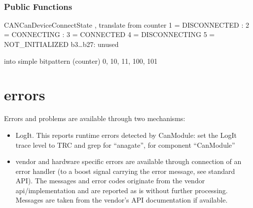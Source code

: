 \documentclass[a4paper,10pt,english]{sphinxmanual}
\begin{document}
\begin{fulllineitems}
\label{\detokenize{vendors/anagate:_CPPv410AnaCanScan}}%
\pysigstartmultiline
{}%
\pysigstopmultiline~\subsubsection*{Public Functions}

\begin{fulllineitems}
\label{\detokenize{vendors/anagate:_CPPv4N10AnaCanScan13getPortStatusEv}}%
\pysigstartmultiline
{}%
\pysigstopmultiline
CANCanDeviceConnectState , translate from counter 1 = DISCONNECTED : 2 = CONNECTING : 3 = CONNECTED 4 = DISCONNECTING 5 = NOT\_INITIALIZED b3…b27: unused

into simple bitpattern (counter) 0, 10, 11, 100, 101 

\end{fulllineitems}


\end{fulllineitems}



\section{errors}
\label{\detokenize{vendors/anagate:errors}}
Errors and problems are available through two mechanisms:
\begin{itemize}
\item {} 
LogIt. This reports runtime errors detected by CanModule:
set the LogIt trace level to TRC and grep for “anagate”, for component “CanModule”

\item {} 
vendor and hardware specific errors are available through connection of
an error handler (to a boost signal carrying the error message, see standard API).
The messages and error codes originate from the vendor api/implementation and are
reported as is without further processing. Messages are taken from the vendor’s API
documentation if available.

\end{itemize}
\end{document}
